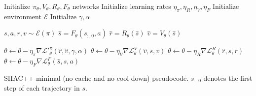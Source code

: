 \begin{algorithm}[t]
    \begin{algorithmic}[1]
    \STATE Initialize $\pi_\theta,V_\theta,R_\theta,F_\theta$ networks
    \STATE Initialize learning rates $\eta_\pi, \eta_R, \eta_V, \eta_F$
    \STATE Initialize environment $\mathcal{E}$
    \STATE Initialize $\gamma, \alpha$
    
        
        \STATE $s,a,r,v \sim \mathcal{E}(\pi)$
        \STATE $\hat{s} = F_\theta(s_{:,0}, a)$
        \STATE $\hat{r} = R_\theta(\hat{s})$
        \STATE $\hat{v} = V_\theta(\hat{s})$
        
        \STATE $\theta \gets \theta - \eta_\pi \nabla \mathcal{L'}^\pi_\theta(\hat{r},\hat{v},\gamma,\alpha)$
        \STATE $\theta \gets \theta - \eta_V \nabla \mathcal{L}^V_\theta(\hat{v},s,v)$
        \STATE $\theta \gets \theta - \eta_R \nabla \mathcal{L}^R_\theta(\hat{r},s,r)$
        \STATE $\theta \gets \theta - \eta_F \nabla \mathcal{L}^F_\theta(\hat{s},s,a)$
    
    \ENDFOR
    
    \end{algorithmic}
    \caption{SHAC++ minimal (no cache and no cool-down) pseudocode. $s_{:,0}$ denotes the first step of each trajectory in $s$.}
    \label{alg:shacpp}
\end{algorithm}


